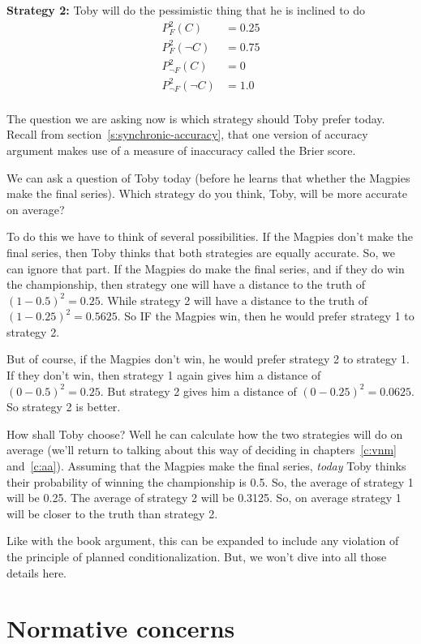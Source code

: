 {\bf Strategy 2:} Toby will do the pessimistic thing that he is inclined to do
\begin{align*}
    P_F^2(C) & = 0.25\\
    P_F^2(\neg C) & = 0.75\\
    P_{\neg F}^2(C) & = 0\\
    P_{\neg F}^2(\neg C) & = 1.0\\
\end{align*}

The question we are asking now is which strategy should Toby prefer today.  Recall from section~\ref{s:synchronic-accuracy}, that one version of accuracy argument makes use of a measure of inaccuracy called the Brier score. 

We can ask a question of Toby today (before he learns that whether the Magpies make the final series). Which strategy do you think, Toby, will be more accurate on average?

To do this we have to think of several possibilities.  If the Magpies don't make the final series, then Toby thinks that both strategies are equally accurate.  So, we can ignore that part.  If the Magpies do make the final series, and if they do win the championship, then strategy one will have a distance to the truth of $(1-0.5)^2 = 0.25$.  While strategy 2 will have a distance to the truth of $(1-0.25)^2 = 0.5625$.  So IF the Magpies win, then he would prefer strategy 1 to strategy 2.

But of course, if the Magpies don't win, he would prefer strategy 2 to strategy 1.  If they don't win, then strategy 1 again gives him a distance of $(0-0.5)^2 = 0.25$.  But strategy 2 gives him a distance of $(0-0.25)^2 = 0.0625$. So strategy 2 is better.

How shall Toby choose?  Well he can calculate how the two strategies will do on average (we'll return to talking about this way of deciding in chapters~\ref{c:vnm} and~\ref{c:aa}).  Assuming that the Magpies make the final series, {\it today} Toby thinks their probability of winning the championship is 0.5.  So, the average of strategy 1 will be 0.25.  The average of strategy 2 will be 0.3125.  So, on average strategy 1 will be closer to the truth than strategy 2.

Like with the book argument, this can be expanded to include any violation of the principle of planned conditionalization. But, we won't dive into all those details here.
    
\section{Normative concerns}

